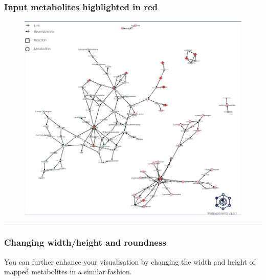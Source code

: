 \documentclass[
  24px,
  letterpaper,
  DIV=11,
  numbers=noendperiod]{scrartcl}
\begin{document}
\hypertarget{input-metabolites-highlighted-in-red}{%
\subsubsection{Input metabolites highlighted in
red}\label{input-metabolites-highlighted-in-red}}

\begin{figure}

{\centering \includegraphics{images/metexplore_viz_node_bg.png}

}

\end{figure}

\begin{center}\rule{0.5\linewidth}{0.5pt}\end{center}

\hypertarget{changing-widthheight-and-roundness}{%
\subsubsection{Changing width/height and
roundness}\label{changing-widthheight-and-roundness}}

You can further enhance your visualisation by changing the width and
height of mapped metabolites in a similar fashion.
\end{document}
